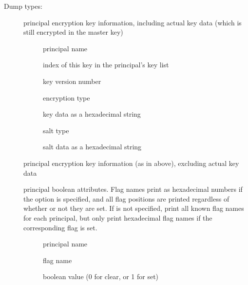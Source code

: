 \documentclass[letterpaper,10pt,english]{sphinxmanual}
\begin{document}
Dump types:
\begin{description}
\item[{}] \leavevmode
principal encryption key information, including actual key data
(which is still encrypted in the master key)
\begin{description}
\item[{}] \leavevmode
principal name

\item[{}] \leavevmode
index of this key in the principal’s key list

\item[{}] \leavevmode
key version number

\item[{}] \leavevmode
encryption type

\item[{}] \leavevmode
key data as a hexadecimal string

\item[{}] \leavevmode
salt type

\item[{}] \leavevmode
salt data as a hexadecimal string

\end{description}

\item[{}] \leavevmode
principal encryption key information (as in  above),
excluding actual key data

\item[{}] \leavevmode
principal boolean attributes.  Flag names print as hexadecimal
numbers if the  option is specified, and all flag positions
are printed regardless of whether or not they are set.  If 
is not specified, print all known flag names for each principal,
but only print hexadecimal flag names if the corresponding flag is
set.
\begin{description}
\item[{}] \leavevmode
principal name

\item[{}] \leavevmode
flag name

\item[{}] \leavevmode
boolean value (0 for clear, or 1 for set)


\end{description}
\end{description}
\end{document}
